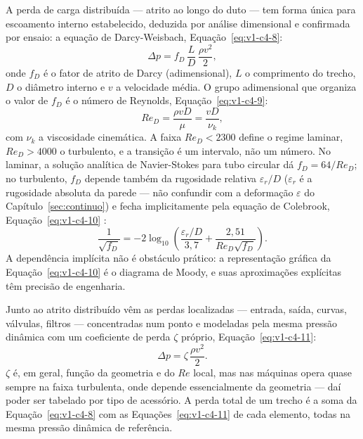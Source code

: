 \documentclass[12pt,a4paper]{article}
\numberwithin{equation}{section}
\numberwithin{table}{section}
\numberwithin{figure}{section}
\begin{document}
A perda de carga distribuída --- atrito ao longo do duto --- tem forma única
para escoamento interno estabelecido, deduzida por análise dimensional e
confirmada por ensaio: a equação de Darcy-Weisbach, Equação~\eqref{eq:v1-c4-8}:
\begin{equation}\label{eq:v1-c4-8}
\Delta p = f_D\,\frac{L}{D}\,\frac{\rho v^2}{2},
\end{equation}
onde $f_D$ é o fator de atrito de Darcy (adimensional), $L$ o comprimento do
trecho, $D$ o diâmetro interno e $v$ a velocidade média. O grupo adimensional
que organiza o valor de $f_D$ é o número de Reynolds,
Equação~\eqref{eq:v1-c4-9}:
\begin{equation}\label{eq:v1-c4-9}
Re_D = \frac{\rho v D}{\mu} = \frac{vD}{\nu_k},
\end{equation}
com $\nu_k$ a viscosidade cinemática. A faixa $Re_D < 2300$ define o regime
laminar, $Re_D > 4000$ o turbulento, e a transição é um intervalo, não um
número. No laminar, a solução analítica de
Navier-Stokes para tubo circular dá $f_D = 64/Re_D$; no turbulento, $f_D$
depende também da rugosidade relativa $\varepsilon_r/D$ ($\varepsilon_r$ é a
rugosidade absoluta da parede --- não confundir com a deformação
$\varepsilon$ do Capítulo~\ref{sec:continuo}) e fecha implicitamente pela
equação de Colebrook, Equação~\eqref{eq:v1-c4-10} \cite{white2011,fox2010br}:
\begin{equation}\label{eq:v1-c4-10}
\frac{1}{\sqrt{f_D}} = -2\log_{10}\!\left(\frac{\varepsilon_r/D}{3{,}7} +
\frac{2{,}51}{Re_D\sqrt{f_D}}\right).
\end{equation}
A dependência implícita não é obstáculo prático: a representação gráfica da
Equação~\eqref{eq:v1-c4-10} é o diagrama de Moody, e suas aproximações
explícitas têm precisão de engenharia.

Junto ao atrito distribuído vêm as perdas localizadas --- entrada, saída,
curvas, válvulas, filtros --- concentradas num ponto e modeladas pela mesma
pressão dinâmica com um coeficiente de perda $\zeta$ próprio,
Equação~\eqref{eq:v1-c4-11}:
\begin{equation}\label{eq:v1-c4-11}
\Delta p = \zeta\,\frac{\rho v^2}{2}.
\end{equation}
$\zeta$ é, em geral, função da geometria e do $Re$ local, mas nas máquinas
opera quase sempre na faixa turbulenta, onde depende essencialmente da
geometria --- daí poder ser tabelado por tipo de acessório. A perda total de
um trecho é a soma da Equação~\eqref{eq:v1-c4-8} com as
Equações~\eqref{eq:v1-c4-11} de cada elemento, todas na mesma pressão
dinâmica de referência.
\end{document}
